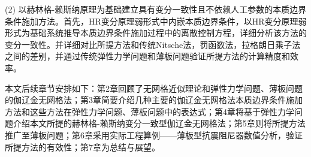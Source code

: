 (2) 以赫林格-赖斯纳原理为基础建立具有变分一致性且不依赖人工参数的本质边界条件施加方法。首先，HR变分原理弱形式中内嵌本质边界条件，以HR变分原理弱形式为基础系统推导本质边界条件施加过程中的离散控制方程，详细分析该方法的变分一致性。并详细对比所提方法和传统Nitsche法，罚函数法，拉格朗日乘子法之间的差别，并通过传统弹性力学问题和薄板问题验证所提方法的计算精度和效率。

本文后续章节安排如下：第2章回顾了无网格近似理论和弹性力学问题、薄板问题的伽辽金无网格法；第3章简要介绍几种主要的伽辽金无网格法本质边界条件施加方法和这些方法在弹性力学问题、薄板问题中的表达式；第4章将基于弹性力学问题介绍本文所提的赫林格-赖斯纳变分一致型伽辽金无网格法；第5章则将所提方法推广至薄板问题；第6章采用实际工程算例——薄板型抗震阻尼器数值分析，验证所提方法的有效性；第7章为总结与展望。

